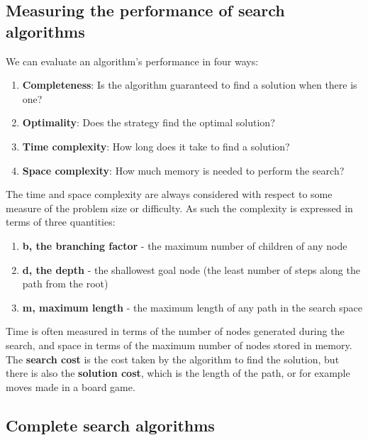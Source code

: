 \documentclass{article}
\begin{document}
\subsection{Measuring the performance of search algorithms}
We can evaluate an algorithm's performance in four ways:
\begin{enumerate}
\item \textbf{Completeness}: Is the algorithm guaranteed to find a solution when there is one?
\item \textbf{Optimality}: Does the strategy find the optimal solution?
\item \textbf{Time complexity}: How long does it take to find a solution?
\item \textbf{Space complexity}: How much memory is needed to perform the search?
\end{enumerate}
\noindent
The time and space complexity are always considered with respect to some measure of the problem size or difficulty. As such the complexity is expressed in terms of three quantities:
\begin{enumerate}
\item \textbf{b, the branching factor} - the maximum number of children of any node
\item \textbf{d, the depth} - the shallowest goal node (the least number of steps along the path from the root)
\item \textbf{m, maximum length} - the maximum length of any  path in the search space
\end{enumerate}
\noindent
Time is often measured in terms of the number of nodes generated during the search, and space in terms of the maximum number of nodes stored in memory. The \textbf{search cost} is the cost taken by the algorithm to find the solution, but there is also the \textbf{solution cost}, which is the length of the path, or for example moves made in a board game. 

\subsection{Complete search algorithms}
\end{document}
